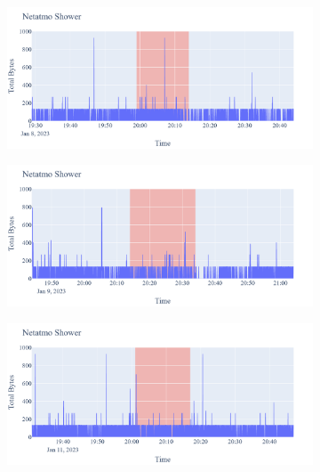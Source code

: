 \begin{figure}[H]
    \begin{subfigure}[b]{0.47\textwidth}
        \centering
        \includegraphics[width=1.2\hsize]{figures/Netatmo_Shower_Bytes_08.01.png}
    \end{subfigure}
    \begin{subfigure}[b]{0.47\textwidth}
        \centering
        \includegraphics[width=1.2\hsize]{figures/Netatmo_Shower_Bytes_09.01.png}
    \end{subfigure}
    \begin{subfigure}[b]{0.47\textwidth}
        \centering
        \includegraphics[width=1.2\hsize]{figures/Netatmo_Shower_Bytes_11.01.png}
    \end{subfigure}
    \begin{subfigure}[b]{0.47\textwidth}

\end{subfigure}
\end{figure}
